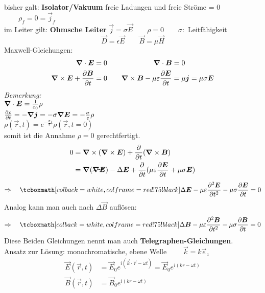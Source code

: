 bisher galt: \textbf{Isolator/Vakuum} freie Ladungen und freie Ströme = 0 $\qquad \rho_f = 0 = \vec{j}_f $\\
im Leiter gilt: \textbf{Ohmsche Leiter} $ \vec{j} = \sigma \vec{E}  \qquad \rho = 0 \qquad \sigma : $ Leitfähigkeit
\begin{equation*}
\vec{D} = \epsilon \vec{E} \qquad \vec{B} = \mu \vec{H}
\end{equation*}
Maxwell-Gleichungen:
\begin{align*}
\bm{\nabla} \cdot \bm{E} &= 0 \qquad \qquad \qquad \ \, \bm{\nabla} \cdot \bm{B} = 0\\
\bm{\nabla} \times \bm{E} + \frac{\partial \bm{B}}{\partial t} &= 0 \qquad \bm{\nabla} \times \bm{B} - \mu \varepsilon \frac{\partial \bm{E}}{\partial t} = \mu \bm{j} = \mu \sigma \bm{E}
\end{align*}
\emph{Bemerkung:}\\
$ \bm{\nabla} \cdot \bm{E} = \frac{1}{\varepsilon_0} \rho $\\
$ \frac{\partial \rho}{\partial t} = - \bm{\nabla} \bm{j} = - \sigma \bm{\nabla} \bm{E} = - \frac{\sigma}{\varepsilon} \rho $\\
$ \rho(\vec{r},t) = e^{-\frac{\sigma}{\epsilon} t} \rho(\vec{r},t=0) $\\
somit ist die Annahme $ \rho = 0 $ gerechtfertigt.\\[15pt]
\begin{align*}
0 &= \bm{\nabla} \times (\bm{\nabla} \times \bm{E}) + \frac{\partial }{\partial t} (\bm{\nabla} \times \bm{B}) \\
&= \bm{\nabla} (\cancel{\bm{\nabla} \bm{E}}) - \Delta \bm{E} + \frac{\partial }{\partial t} (\mu \varepsilon \frac{\partial \bm{E}}{\partial t} + \mu \sigma \bm{E})
\end{align*}
\begin{equation*}
\Rightarrow \quad \rmbox{\Delta \vec{E} - \mu \epsilon \prt{^2 \vec{E}}{t^2} - \mu \sigma \prt{\vec{E}}{t} = 0}
\end{equation*}
Analog kann man auch nach $ \Delta \vec{B} $ auflösen:
\begin{equation*}
\Rightarrow \quad \rmbox{\Delta \vec{B} - \mu \epsilon \prt{^2 \vec{B}}{t^2} - \mu \sigma \prt{\vec{B}}{t} = 0}
\end{equation*}
Diese Beiden Gleichungen nennt man auch \textbf{Telegraphen-Gleichungen}.\\[5pt]
Ansatz zur Lösung: monochromatische, ebene Welle $ \qquad \vec{k} = k \vec{e}_z $
\begin{align*}
\vec{E}(\vec{r},t) &= \vec{E}_0 e^{i(\vec{k} \cdot \vec{r} - \omega t)} = \vec{E}_0 e^{i(k r - \omega t)}\\
\vec{B}(\vec{r},t) &= \vec{B}_0 e^{i(k r - \omega t)}
\end{align*}
